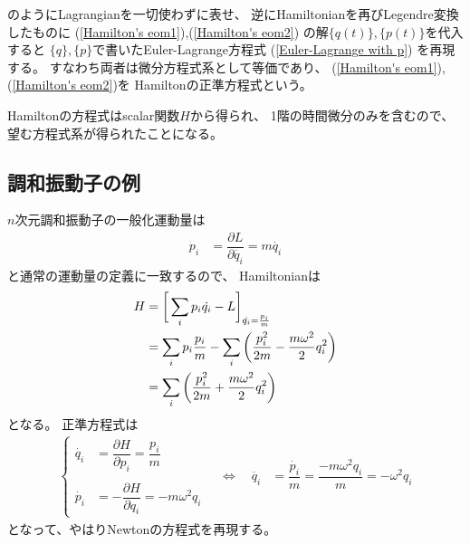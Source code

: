 \documentclass[dvipdfmx]{jsarticle}
\begin{document}
のようにLagrangianを一切使わずに表せ、
逆にHamiltonianを再びLegendre変換したものに
(\ref{Hamilton's eom1}),(\ref{Hamilton's eom2})
の解$\{q(t)\},\{p(t)\}$を代入すると
$\{q\},\{p\}$で書いたEuler-Lagrange方程式
(\ref{Euler-Lagrange with p})
を再現する。
すなわち両者は微分方程式系として等価であり、
(\ref{Hamilton's eom1}), 
(\ref{Hamilton's eom2})を
Hamiltonの正準方程式という。

Hamiltonの方程式はscalar関数$H$から得られ、
1階の時間微分のみを含むので、
望む方程式系が得られたことになる。

\subsection{調和振動子の例}

$n$次元調和振動子の一般化運動量は
\begin{align}
  p_i &= \dfrac{\partial L}{\partial \dot{q_i}}
=
  m \dot{q_i}
\end{align}
と通常の運動量の定義に一致するので、
Hamiltonianは
\begin{align}
  H &= \bigg[
    \sum_i p_i \dot{q_i}
    - L
    \bigg]_{ \dot{q_i} = \frac{p_i}{m} }
\notag\\&=
    \sum_i p_i \frac{p_i}{m}
    - 
      \sum_i \bigg(
      \dfrac{p_i^2}{2m}
    -
      \dfrac{ m \omega^2 }{2}
      q_i^2
    \bigg)
\notag\\&=
    \sum_i \bigg(
      \dfrac{p_i^2}{2m}
    +
      \dfrac{ m \omega^2 }{2}
      q_i^2
    \bigg)
\end{align}
となる。
正準方程式は
\begin{align}
  \begin{cases}
    \dot{q_i} &= \dfrac{\partial H}{\partial p_i}
    = \dfrac{p_i}{m}
  \\\\
    \dot{p_i} &= - \dfrac{\partial H}{\partial q_i}
    = - m \omega^2 q_i  
  \end{cases}
\quad
\Leftrightarrow
\quad
  \ddot{q_i} &= \dfrac{\dot{p_i}}{m}
  = \dfrac{- m \omega^2 q_i}{m} 
  = - \omega^2 q_i
\end{align}
となって、やはりNewtonの方程式を再現する。

\end{document}
